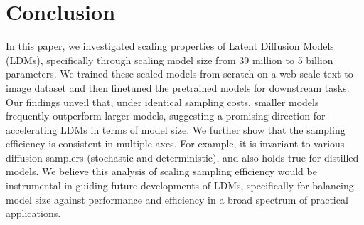 \section{Conclusion}
In this paper, we investigated scaling properties of Latent Diffusion Models (LDMs), specifically through scaling model size from 39 million to 5 billion parameters.
We trained these scaled models from scratch on a web-scale text-to-image dataset and then finetuned the pretrained models for downstream tasks.
Our findings unveil that, under identical sampling costs, smaller models frequently outperform larger models, suggesting a promising direction for accelerating LDMs in terms of model size.
We further show that the sampling efficiency is consistent in multiple axes. For example, it is invariant to various diffusion samplers (stochastic and deterministic), and also holds true for distilled models.
We believe this analysis of scaling sampling efficiency would  be instrumental in guiding future developments of LDMs, specifically for balancing model size against performance and efficiency in a broad spectrum of practical applications.
